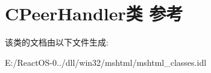 \hypertarget{class_c_peer_handler}{}\section{C\+Peer\+Handler类 参考}
\label{class_c_peer_handler}


该类的文档由以下文件生成\+:\begin{DoxyCompactItemize}
\item 
E\+:/\+React\+O\+S-\/0../dll/win32/mshtml/mshtml\+\_\+classes.\+idl\end{DoxyCompactItemize}
